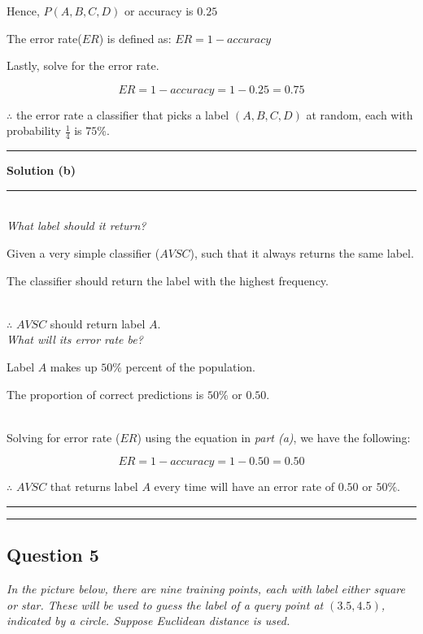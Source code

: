 \documentclass{article}
\begin{document}
Hence, $P(A,B,C,D)$ or accuracy is $0.25$

The error rate($ER$) is defined as: $ER = 1 - accuracy$

Lastly, solve for the error rate.

$$ER = 1 - accuracy = 1 - 0.25 = 0.75$$

$\therefore$ the error rate a classifier that picks a label $(A, B, C, D)$ at random, each with probability $\frac{1}{4}$ is $75$\%.

\noindent\rule{\textwidth}{0.4pt}
\newpage
\textbf{Solution (b)} 

\noindent\rule{\textwidth}{0.4pt}\\

\textit{What label should it return?}\\

\parbox{\textwidth}{Given a very simple classifier ($AVSC$), such that it always returns the same label.}

\parbox{\textwidth}{ The classifier should return the label with the highest frequency.}\\

$\therefore$ $AVSC$ should return label $A$.\\

\textit{What will its error rate be?}\\

\parbox{\textwidth}{Label $A$ makes up $50\%$ percent of the population.}

\parbox{\textwidth}{The proportion of correct predictions is $50\%$ or $0.50$.}\\

Solving for error rate ($ER$) using the equation in \textit{part (a)}, we have the following:

$$ER = 1 - accuracy = 1 - 0.50 = 0.50$$

$\therefore$ $AVSC$ that returns label $A$ every time will have an error rate of $0.50$ or $50\%$.

\noindent\rule{\textwidth}{0.4pt}

\noindent\rule{\textwidth}{0.4pt}

\subsection*{Question 5}

\textit{In the picture below, there are nine training points, each with label either square or star. These will be used to guess the label of a query point at $(3.5, 4.5)$, indicated by a circle. Suppose Euclidean distance is used.}
\end{document}
